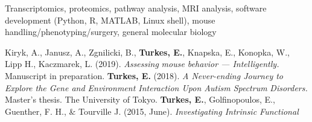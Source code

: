%
%
%

\vspace*{-0.2cm}

\begin{cvskills}

    {Transcriptomics, proteomics, pathway analysis, MRI analysis, software development
        (Python, R, \newline MATLAB, Linux shell), mouse handling/phenotyping/surgery,
        general molecular biology}

    \vspace*{-0.1cm}
    {\small{Kiryk, A., Janusz, A., Zgnilicki, B., \textbf{Turkes, E.}, Knapska, E.,
        Konopka, W., Lipp H., Kaczmarek, L. (2019). \textit{Assessing}}
        \vspace*{-0.001cm}}
    \cvskill{}
    {\small{\hspace*{20pt}\textit{mouse behavior — Intelligently.} Manuscript in
        preparation.}}
    \vspace*{-0.1cm}
    \cvskill{}
    {\small{\textbf{Turkes, E.} (2018). \textit{A Never-ending Journey to Explore the
        Gene and Environment Interaction Upon Autism Spectrum}}\vspace*{-0.001cm}}
    \cvskill{}
    {\small{\hspace*{20pt}\textit{Disorders.} Master's thesis. The
        University of Tokyo.}}
    \vspace*{-0.1cm}
    \cvskill{}
    {\small{\textbf{Turkes, E.}, Golfinopoulos, E., Guenther, F. H., \& Tourville J. (2015,
        June). \textit{Investigating Intrinsic Functional}}}
    \cvskill{}
    {\small{}}

\vspace*{-1cm}
\end{cvskills}
